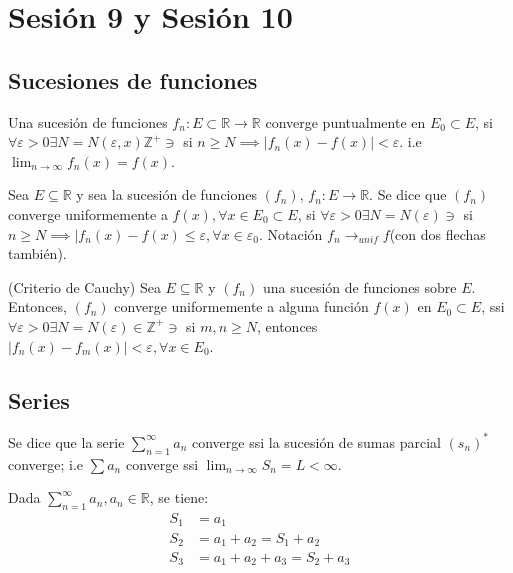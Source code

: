 \section{Sesión 9 y Sesión 10}


\subsection{Sucesiones de funciones}
\begin{definicion}
	Una sucesión de funciones $f_n:E\subset \mathbb{R}\to\mathbb{R}$ converge puntualmente en $E_0\subset E$, si $\forall \varepsilon>0\exists N=N(\varepsilon,x)\mathbb{Z}^+\ni$ si $n\geq N\implies |f_n(x)-f(x)|<\varepsilon$. 
	i.e $\lim_{n\to\infty}f_n(x)=f(x)$.
\end{definicion}

\begin{definicion}
	Sea $E\subseteq \mathbb{R}$ y sea la sucesión de funciones $(f_n)$, $f_n:E\to\mathbb{R}$. Se dice que $(f_n)$ converge uniformemente a $f(x),\forall x\in E_0\subset E$, si $\forall \varepsilon >0\exists N=N(\varepsilon)\ni$ si $n\geq N\implies |f_n(x)-f(x)\leq \varepsilon,\forall x\in \varepsilon_0$. Notación $f_n\to_{unif}f$(con dos flechas también).
\end{definicion}

\begin{definicion}(Criterio de Cauchy)
	Sea $E\subseteq \mathbb{R}$ y $(f_n)$ una sucesión de funciones sobre $E$. Entonces, $(f_n)$ converge uniformemente a alguna función $f(x)$ en $E_0\subset E$, ssi $\forall \varepsilon >0\exists N=N(\varepsilon)\in \mathbb{Z}^+\ni $ si $m,n\geq N$, entonces $|f_n(x)-f_m(x)|<\varepsilon,\forall x\in E_0$. 
\end{definicion}

\subsection{Series}

\begin{definicion}
	Se dice que la serie $\sum_{n=1}^\infty a_n$ converge ssi la sucesión de sumas parcial $(s_n)^*$ converge; i.e $\sum a_n$ converge ssi $\lim_{n\to\infty} S_n =L <\infty$. 
	
	
	Dada $\sum_{n=1}^{\infty} a_n, a_n\in \mathbb{R}$, se tiene: 
	\begin{align*}
		S_1 &= a_1\\
		S_2 &= a_1+a_2 = S_1+a_2\\
		S_3 &= a_1 + a_2 + a_3 = S_2+a_3
	\end{align*}
\end{definicion}

